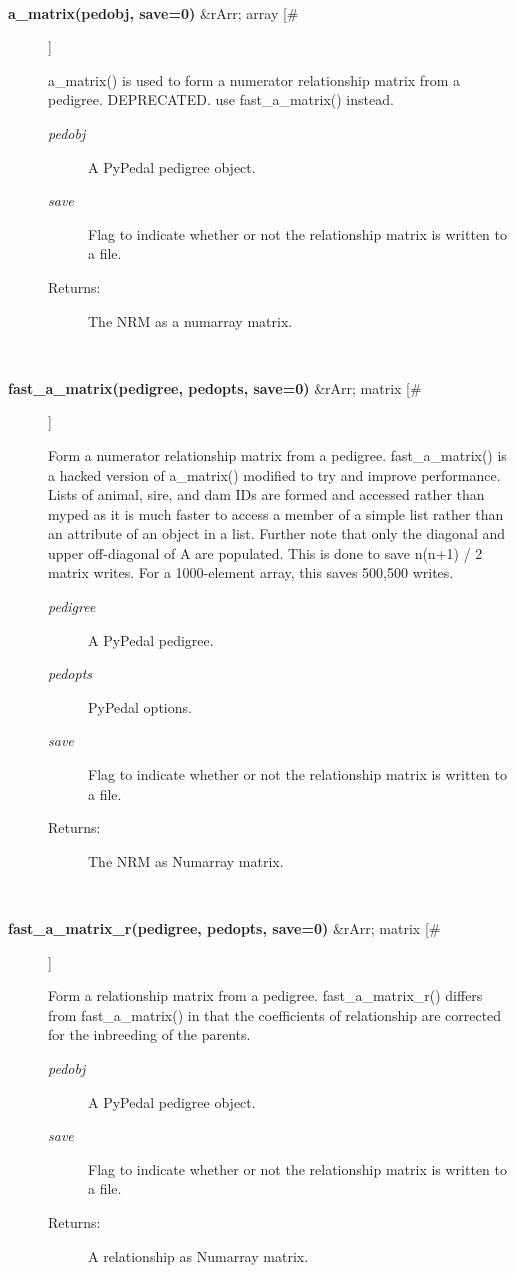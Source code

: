 \begin{description}
\begin{description}
\end{description}
\\ 

\item[\textbf{a\_matrix(pedobj, save=0)}
 \&rArr; array [\#]]

 a\_matrix() is used to form a numerator relationship matrix from a pedigree. DEPRECATED. use fast\_a\_matrix() instead.
\begin{description}
\item[\emph{pedobj}
] A PyPedal pedigree object.
\item[\emph{save}
] Flag to indicate whether or not the relationship matrix is written to a file.
\item[Returns:] The NRM as a numarray matrix.

\end{description}
\\ 

\item[\textbf{fast\_a\_matrix(pedigree, pedopts, save=0)}
 \&rArr; matrix [\#]]

 Form a numerator relationship matrix from a pedigree. fast\_a\_matrix() is a hacked version of a\_matrix() modified to try and improve performance. Lists of animal, sire, and dam IDs are formed and accessed rather than myped as it is much faster to access a member of a simple list rather than an attribute of an object in a list. Further note that only the diagonal and upper off-diagonal of A are populated. This is done to save n(n+1) / 2 matrix writes. For a 1000-element array, this saves 500,500 writes.
\begin{description}
\item[\emph{pedigree}
] A PyPedal pedigree.
\item[\emph{pedopts}
] PyPedal options.
\item[\emph{save}
] Flag to indicate whether or not the relationship matrix is written to a file.
\item[Returns:] The NRM as Numarray matrix.

\end{description}
\\ 

\item[\textbf{fast\_a\_matrix\_r(pedigree, pedopts, save=0)}
 \&rArr; matrix [\#]]

 Form a relationship matrix from a pedigree. fast\_a\_matrix\_r() differs from fast\_a\_matrix() in that the coefficients of relationship are corrected for the inbreeding of the parents.
\begin{description}
\item[\emph{pedobj}
] A PyPedal pedigree object.
\item[\emph{save}
] Flag to indicate whether or not the relationship matrix is written to a file.
\item[Returns:] A relationship as Numarray matrix.


\end{description}
\end{description}
